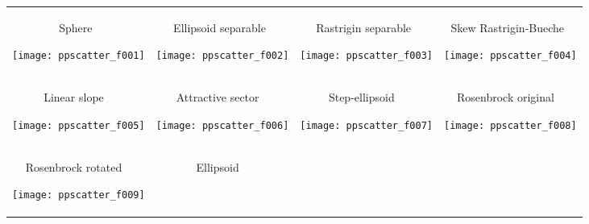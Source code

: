 \documentclass{sig-alternate}
\begin{document}
\begin{figure*}
\begin{tabular}{*{4}{@{}c@{}}}
\begin{turn}{90}\parbox{0.21\textwidth}{\hfill{} Sphere\hfill~}\end{turn}
    \texttt{[image: ppscatter\_f001]}&
\begin{turn}{90}\parbox{0.21\textwidth}{\hfill{} Ellipsoid separable\hfill~}\end{turn} 
    \texttt{[image: ppscatter\_f002]}&
\begin{turn}{90}\parbox{0.21\textwidth}{\hfill{} Rastrigin separable\hfill~}\end{turn} 
    \texttt{[image: ppscatter\_f003]}&
\begin{turn}{90}\parbox{0.21\textwidth}{\hfill{} Skew Rastrigin-Bueche\hfill~}\end{turn} 
    \texttt{[image: ppscatter\_f004]}\\[-2.2ex]
\begin{turn}{90}\parbox{0.21\textwidth}{\hfill{} Linear slope \hfill~}\end{turn} 
    \texttt{[image: ppscatter\_f005]}&
\begin{turn}{90}\parbox{0.21\textwidth}{\hfill{} Attractive sector \hfill~}\end{turn} 
    \texttt{[image: ppscatter\_f006]}&
\begin{turn}{90}\parbox{0.21\textwidth}{\hfill{} Step-ellipsoid \hfill~}\end{turn} 
    \texttt{[image: ppscatter\_f007]}&
\begin{turn}{90}\parbox{0.21\textwidth}{\hfill{} Rosenbrock original \hfill~}\end{turn} 
    \texttt{[image: ppscatter\_f008]}\\[-2.2ex]
\begin{turn}{90}\parbox{0.21\textwidth}{\hfill{} Rosenbrock rotated \hfill~}\end{turn} 
    \texttt{[image: ppscatter\_f009]}&
\begin{turn}{90}\parbox{0.21\textwidth}{\hfill{} Ellipsoid \hfill~}\end{turn} 

\end{tabular}
\end{figure*}
\end{document}
